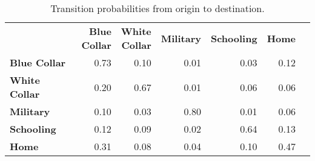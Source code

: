 \begin{ThreePartTable}

	\begin{longtable}[c]{@{}lrrrrrr@{}}
		\caption{Transition probabilities from origin to destination.}
		\label{tab:TransitionProbabilitiesOriginToDestination}

		\setlength\extrarowheight{2.5pt}
		
		\\
		\toprule
   & \thead{\textbf{Blue} \\ \textbf{Collar}}    & \thead{\textbf{White} \\ \textbf{Collar}}  & \textbf{Military} & \textbf{Schooling} & \textbf{Home}   \\ \midrule
		\endfirsthead
		
\textbf{Blue Collar}	&	0.73	&	0.10	&	0.01	&	0.03	&	0.12	\\
\textbf{White Collar	} &	0.20	&	0.67	&	0.01	&	0.06	&	0.06	\\
\textbf{Military	} &	0.10	&	0.03	&	0.80	&	0.01	&	0.06	\\
\textbf{Schooling}	&	0.12	&	0.09	&	0.02	&	0.64	&	0.13	\\
\textbf{Home	} &	0.31	&	0.08	&	0.04	&	0.10	&	0.47	\\
  \bottomrule
	\end{longtable}
\end{ThreePartTable}